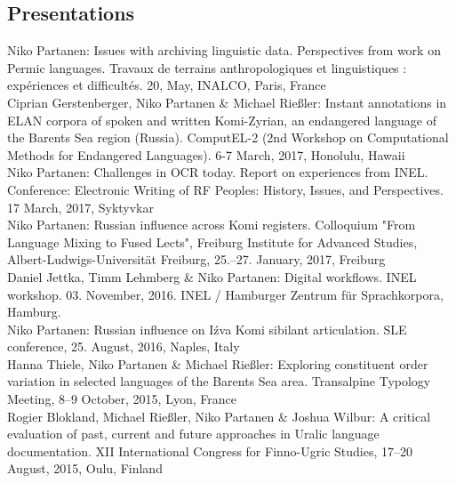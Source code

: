 \documentclass[11pt, a4paper]{article}
\newcommand{\years}[1]{\marginnote{\scriptsize #1}} %
\begin{document}
\subsection*{Presentations}

\years{2017}Niko Partanen: Issues with archiving linguistic data. Perspectives from work on Permic languages. Travaux de terrains anthropologiques et linguistiques : expériences et difficultés. 20, May, INALCO, Paris, France\\

\years{2017}Ciprian Gerstenberger, Niko Partanen \& Michael Rießler: Instant annotations in ELAN corpora of spoken and written Komi-Zyrian, an endangered language of the Barents Sea region (Russia). ComputEL-2 (2nd Workshop on Computational Methods for Endangered Languages). 6-7 March, 2017, Honolulu, Hawaii\\

\years{2017} Niko Partanen: Challenges in OCR today. Report on experiences from INEL. Conference: Electronic Writing of RF Peoples: History, Issues, and Perspectives. 17 March, 2017, Syktyvkar\\

\years{2017} Niko Partanen: Russian influence across Komi registers. Colloquium "From Language Mixing to Fused Lects", Freiburg Institute for Advanced Studies, Albert-Ludwigs-Universität Freiburg, 25.--27. January, 2017, Freiburg\\

\years{2016} Daniel Jettka, Timm Lehmberg \& Niko Partanen: Digital workflows. INEL workshop. 03. November, 2016. INEL / Hamburger Zentrum für Sprachkorpora, Hamburg.\\

\years{2016} Niko Partanen: Russian influence on Iźva Komi sibilant articulation. SLE conference, 25. August, 2016, Naples, Italy\\

\years{2015} Hanna Thiele, Niko Partanen \& Michael Rießler: Exploring constituent order variation in selected languages of the Barents Sea area. Transalpine Typology Meeting, 8–9 October, 2015, Lyon, France\\

\years{2015} Rogier Blokland, Michael Rießler, Niko Partanen \& Joshua Wilbur: A critical evaluation of past, current and future approaches in Uralic language documentation. XII International Congress for Finno-Ugric Studies, 17–20 August, 2015, Oulu, Finland\\
\end{document}
